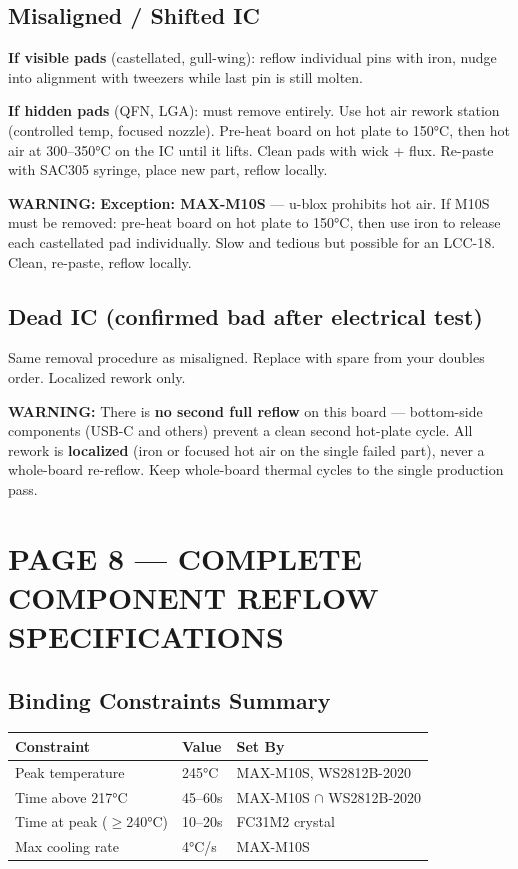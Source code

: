 \documentclass[11pt,a4paper]{article}
\newcommand{\dangerbox}[1]{\par\noindent\colorbox{danger!10}{\parbox{\dimexpr\textwidth-2\fboxsep}{%
\textcolor{danger}{\textbf{WARNING:}} #1}}\par\vspace{0.5em}}
\begin{document}
\subsection*{Misaligned / Shifted IC}

\textbf{If visible pads} (castellated, gull-wing): reflow individual pins with iron, nudge into alignment with tweezers while last pin is still molten.

\textbf{If hidden pads} (QFN, LGA): must remove entirely. Use hot air rework station (controlled temp, focused nozzle). Pre-heat board on hot plate to 150°C, then hot air at 300--350°C on the IC until it lifts. Clean pads with wick + flux. Re-paste with SAC305 syringe, place new part, reflow locally.

\dangerbox{\textbf{Exception: MAX-M10S} — u-blox prohibits hot air. If M10S must be removed: pre-heat board on hot plate to 150°C, then use iron to release each castellated pad individually. Slow and tedious but possible for an LCC-18. Clean, re-paste, reflow locally.}

\subsection*{Dead IC (confirmed bad after electrical test)}

Same removal procedure as misaligned. Replace with spare from your doubles order. Localized rework only.

\dangerbox{There is \textbf{no second full reflow} on this board — bottom-side components (USB-C and others) prevent a clean second hot-plate cycle. All rework is \textbf{localized} (iron or focused hot air on the single failed part), never a whole-board re-reflow. Keep whole-board thermal cycles to the single production pass.}

\newpage
\section*{PAGE 8 — COMPLETE COMPONENT REFLOW SPECIFICATIONS}

\subsection*{Binding Constraints Summary}

\begin{table}[H]
\centering
\begin{tabular}{@{}lll@{}}
\toprule
\textbf{Constraint} & \textbf{Value} & \textbf{Set By} \\
\midrule
Peak temperature & 245°C & MAX-M10S, WS2812B-2020 \\
Time above 217°C & 45--60s & MAX-M10S $\cap$ WS2812B-2020 \\
Time at peak ($\geq$240°C) & 10--20s & FC31M2 crystal \\
Max cooling rate & 4°C/s & MAX-M10S \\
\bottomrule
\end{tabular}
\end{table}
\end{document}
